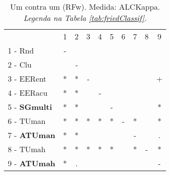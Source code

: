 \begin{table}[h]
\caption{Um contra um (RFw). Medida: ALCKappa. \textit{Legenda na Tabela \ref{tab:friedClassif}.}}
\begin{center}\begin{tabular}{lcc|cc|cc|cc|c}
 			& 1 & 2 & 3 & 4 & 5 & 6 & 7 & 8 & 9\\
1 - Rnd  	& - &   &   &   &   &   &   &   &   \\
2 - Clu  	&   & - &   &   &   &   &   &   &   \\ \hline
3 - EERent	& * & * & - &   &   &   &   &   & + \\
4 - EERacu	& * & * &   & - &   &   &   &   &   \\ \hline
5 - \textbf{SGmulti}	& * & * &   &   & - &   &   &   & * \\
6 - TUman	& * & * & * & * & * & - & * &   & * \\ \hline
7 - \textbf{ATUman}	& * & * &   &   &   &   & - &   & . \\
8 - TUmah	& * & * & * & * & * &   & * & - & * \\ \hline
9 - \textbf{ATUmah}	& * & . &   &   &   &   &   &   & - \\\end{tabular}
\label{stratsALCKappaFriedRFwRedux}
\end{center}
\end{table}
